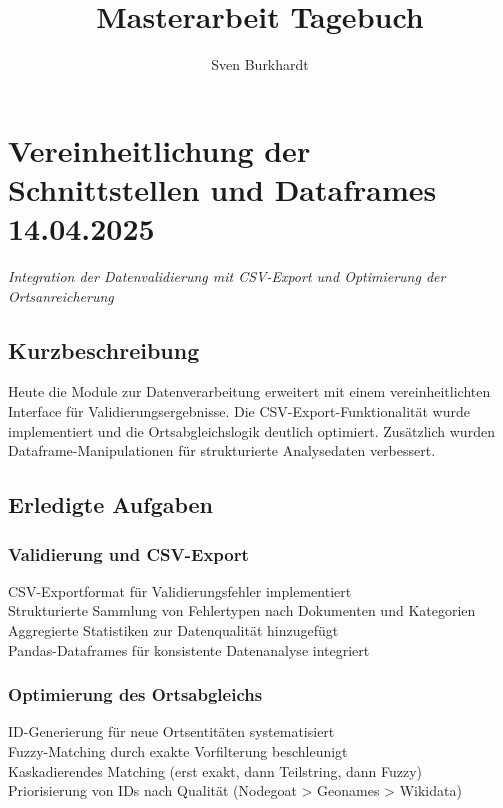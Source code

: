 \documentclass{article}
\title{\Huge Masterarbeit Tagebuch}
\author{Sven Burkhardt}
\date{}
\begin{document}
\maketitle
\noindent
\hrulefill

\newpage %
\tableofcontents


\noindent\hrulefill

\section{Vereinheitlichung der Schnittstellen und Dataframes \small 14.04.2025}
\small\textit{Integration der Datenvalidierung mit CSV-Export und Optimierung der Ortsanreicherung}\\

\subsection*{Kurzbeschreibung}
Heute die Module zur Datenverarbeitung erweitert mit einem vereinheitlichten Interface für Validierungsergebnisse. Die CSV-Export-Funktionalität wurde implementiert und die Ortsabgleichslogik deutlich optimiert. Zusätzlich wurden Dataframe-Manipulationen für strukturierte Analysedaten verbessert.

\subsection*{Erledigte Aufgaben}
\subsubsection*{\small Validierung und CSV-Export}
 CSV-Exportformat für Validierungsfehler implementiert\\
 Strukturierte Sammlung von Fehlertypen nach Dokumenten und Kategorien\\
 Aggregierte Statistiken zur Datenqualität hinzugefügt\\
 Pandas-Dataframes für konsistente Datenanalyse integriert

\subsubsection*{\small Optimierung des Ortsabgleichs}
 ID-Generierung für neue Ortsentitäten systematisiert\\
 Fuzzy-Matching durch exakte Vorfilterung beschleunigt\\
 Kaskadierendes Matching (erst exakt, dann Teilstring, dann Fuzzy)\\
 Priorisierung von IDs nach Qualität (Nodegoat > Geonames > Wikidata)
\end{document}
